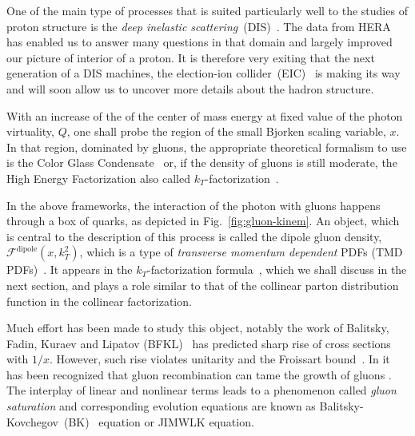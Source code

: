 \documentclass[11pt]{article}
\newcommand{\fdp}[0]{\mathcal{F}^{\mathrm{dipole}}}
\begin{document}
One of the main type of processes that is suited particularly well to the studies
of proton structure is the {\it deep inelastic
scattering}~(DIS)~\cite{Roberts:1990ww,Collins:2011zzd}. The data from HERA has
enabled us to answer many questions in that domain and largely improved our
picture of interior of a proton. 
It is therefore very exiting that the next generation of a DIS machines,
the election-ion collider~(EIC)~\cite{NAP25171} is making its way and will soon
allow us to uncover more details about the hadron structure.

With an increase of the of the center of mass energy at fixed value of the
photon virtuality, $Q$, one shall probe  the region of the small Bjorken scaling
variable, $x$.  
In that region, dominated by gluons\cite{Roberts:1990ww,Collins:2011zzd,
Kovchegov:2012mbw}, the appropriate theoretical formalism to use is the Color
Glass Condensate~\cite{McLerran:1993ni, Ayala:1995kg, Kovchegov:1996ty,Jalilian-Marian:1996mkd,Iancu:2000hn,Iancu:2001ad,Ferreiro:2001qy,Iancu:2002xk} or, if the density of gluons is still moderate, the
High Energy Factorization also called $k_T$-factorization~\cite{Catani:1990xk,Catani:1990eg,Collins:1991ty,Catani:1993ww,Catani:1993rn,Catani:1994sq}. 

In the above frameworks, the interaction of the photon with gluons happens
through a box of quarks, as depicted in Fig.~\ref{fig:gluon-kinem}. An object,
which is central to the description of this process is called the dipole gluon
density, $\fdp(x,k_T^2)$, which is a type of {\it transverse momentum
dependent} PDFs (TMD
PDFs)~\cite{Bomhof:2006dp,Dominguez:2010xd,Dominguez:2011wm,Xiao:2017yya}. 
%
It appears in the $k_T$-factorization
formula~\cite{Catani:1990eg,Dominguez:2010xd,Dominguez:2011wm,Xiao:2017yya},
which we shall discuss in the next section, and plays a role similar to that of
the collinear parton distribution function in the collinear factorization.  

Much effort has been made
to study this object, notably the work of Balitsky, Fadin, Kuraev and Lipatov
(BFKL)~\cite{Balitsky:1978ic, Kuraev:1977fs} has predicted sharp rise of cross
sections with $1/x$.  However, such rise violates unitarity and the Froissart
bound~\cite{Roberts:1990ww,Collins:2011zzd,Kovchegov:2012mbw,Barone:1993sy}. In
\cite{Gribov:1983ivg} it has been recognized that gluon recombination can tame
the growth of gluons \cite{Gribov:1983ivg}. The interplay of linear and
nonlinear terms leads to a phenomenon called {\it gluon saturation} and
corresponding evolution equations are known as
Balitsky-Kovchegov~(BK)~\cite{Balitsky:1995ub,Kovchegov:1999yj} equation or
JIMWLK\cite{Kovner:1999bj,Kovner:2000pt,Iancu:2000hn,JalilianMarian:1997dw,JalilianMarian:1997gr,JalilianMarian:1997jx} equation.
\end{document}
